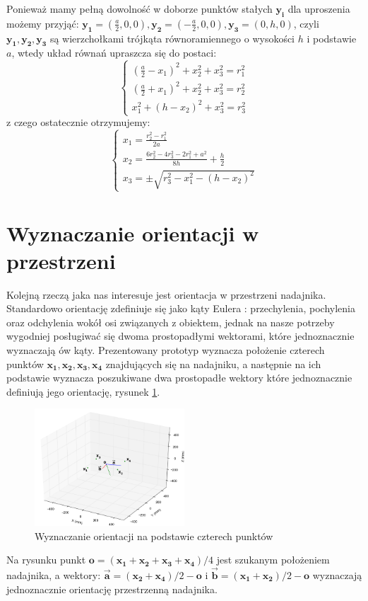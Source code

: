Ponieważ mamy pełną dowolność w doborze punktów stałych $\boldsymbol{y_i}$ dla uproszenia możemy przyjąć:
$\boldsymbol{y_1}=(\frac{a}{2},0,0), \boldsymbol{y_2}=(-\frac{a}{2},0,0), \boldsymbol{y_3}=(0,h,0)$, czyli $\boldsymbol{y_1}, \boldsymbol{y_2}, \boldsymbol{y_3}$ są wierzchołkami
trójkąta równoramiennego o wysokości $h$ i podstawie $a$, wtedy układ równań upraszcza
się do postaci:
\[
 \begin{cases}
     (\frac{a}{2}-x_1)^2 + x_2^2 + x_3^2 = r_1^2
 \\  (\frac{a}{2}+x_1)^2 + x_2^2 + x_3^2 = r_2^2
 \\  x_1^2 + (h-x_2)^2 + x_3^2 = r_3^2
 \end{cases}
\]
z czego ostatecznie otrzymujemy:
\[
 \begin{cases}
     x_1 = \frac{r_2^2 - r_1^2}{2a}
 \\  x_2 = \frac{6r_2^2 - 4r_3^2 - 2r_1^2 + a^2}{8h}  + \frac{h}{2}
 \\  x_3 = \pm \sqrt{r_3^2-x_1^2-(h-x_2)^2}
 \end{cases}
\]


\section{Wyznaczanie orientacji w przestrzeni}


Kolejną rzeczą jaka nas interesuje jest orientacja w przestrzeni nadajnika.
Standardowo orientację zdefiniuje się jako kąty Eulera \cite{bib:katyEulera}: przechylenia, 
pochylenia oraz odchylenia wokół osi związanych z obiektem, jednak na nasze potrzeby wygodniej 
posługiwać się dwoma prostopadłymi wektorami, które jednoznacznie wyznaczają ów kąty. 
Prezentowany prototyp wyznacza położenie czterech punktów $\boldsymbol{x_1, x_2, x_3, x_4}$ znajdujących się
na nadajniku, a następnie na ich podstawie wyznacza poszukiwane dwa prostopadłe wektory które jednoznacznie
definiują jego orientację, rysunek \ref{fig:orientacja}.
 \begin{figure}[H]
    \centering
    \includegraphics[width=0.5\textwidth, trim= 0mm 0mm 0mm 0mm,clip]{orientacja}
    \caption{Wyznaczanie orientacji na podstawie czterech punktów}
    \label{fig:orientacja}
\end{figure}
Na rysunku punkt $\boldsymbol{o} = (\boldsymbol{x_1} + \boldsymbol{x_2} + \boldsymbol{x_3} + \boldsymbol{x_4})/4$ jest szukanym położeniem
nadajnika, a wektory: $\boldsymbol{\overrightarrow{a}} = (\boldsymbol{x_2} + \boldsymbol{x_4})/2 - \boldsymbol{o}$ i 
$\boldsymbol{\overrightarrow{b}} = (\boldsymbol{x_1} + \boldsymbol{x_2})/2 - \boldsymbol{o}$ wyznaczają jednoznacznie
orientację przestrzenną nadajnika.

